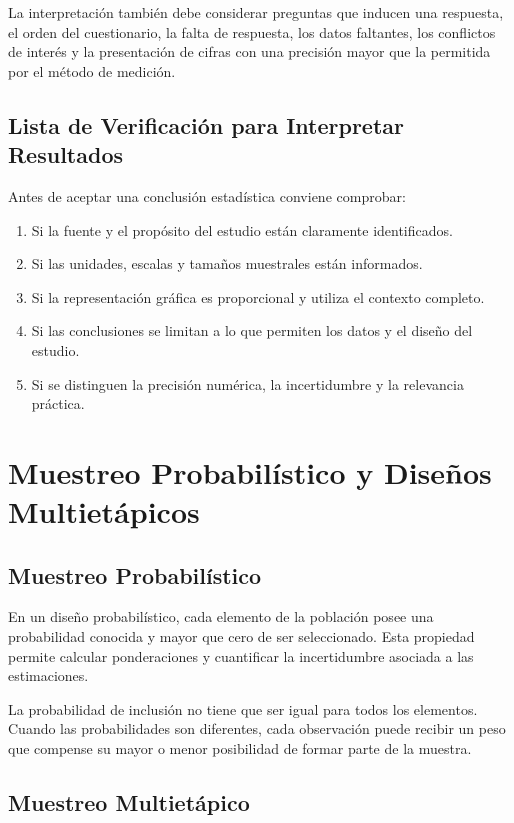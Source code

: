 La interpretación también debe considerar preguntas que inducen una respuesta, el orden del cuestionario, la falta de respuesta, los datos faltantes, los conflictos de interés y la presentación de cifras con una precisión mayor que la permitida por el método de medición.

\subsection{Lista de Verificación para Interpretar Resultados}

Antes de aceptar una conclusión estadística conviene comprobar:

\begin{enumerate}
    \item Si la fuente y el propósito del estudio están claramente identificados.
    \item Si las unidades, escalas y tamaños muestrales están informados.
    \item Si la representación gráfica es proporcional y utiliza el contexto completo.
    \item Si las conclusiones se limitan a lo que permiten los datos y el diseño del estudio.
    \item Si se distinguen la precisión numérica, la incertidumbre y la relevancia práctica.
\end{enumerate}

\section{Muestreo Probabilístico y Diseños Multietápicos}

\subsection{Muestreo Probabilístico}

En un diseño probabilístico, cada elemento de la población posee una probabilidad conocida y mayor que cero de ser seleccionado. Esta propiedad permite calcular ponderaciones y cuantificar la incertidumbre asociada a las estimaciones.

La probabilidad de inclusión no tiene que ser igual para todos los elementos. Cuando las probabilidades son diferentes, cada observación puede recibir un peso que compense su mayor o menor posibilidad de formar parte de la muestra.

\subsection{Muestreo Multietápico}

